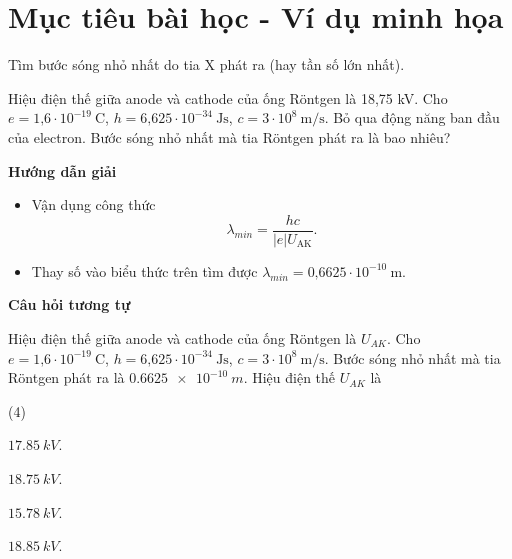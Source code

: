 \section{Mục tiêu bài học - Ví dụ minh họa}

\begin{dang}{Tìm bước sóng nhỏ nhất do tia X phát ra (hay tần số lớn nhất).}


{
Hiệu điện thế giữa anode và cathode của ống R\"ontgen là 18,75 kV. Cho $e =\text{1,6} \cdot 10^{-19}\ \text{C}$, $h = \text{6,625}\cdot 10^{-34}\ \text{Js}$, $c = 3\cdot 10^8\ \text{m/s}$. Bỏ qua động năng ban đầu của electron. Bước sóng nhỏ nhất mà tia R\"ontgen phát ra là bao nhiêu?}
{\begin{center}
\textbf{Hướng dẫn giải}
\end{center}
\begin{itemize}
	\item Vận dụng công thức 
	\begin{equation*}
	\lambda_{min}= \dfrac{hc}{|e|U_{\text{AK}}}.
	\end{equation*}
	\item Thay số vào biểu thức trên tìm được $\lambda_{min}=\text{0,6625} \cdot 10^{-10}\ \text{m}$.
\end{itemize}
\begin{center}
\textbf{Câu hỏi tương tự}
\end{center}

Hiệu điện thế giữa anode và cathode của ống R\"ontgen là $ U_{AK} $. Cho $e =\text{1,6} \cdot 10^{-19}\ \text{C}$, $h = \text{6,625}\cdot 10^{-34}\ \text{Js}$, $c = 3\cdot 10^8\ \text{m/s}$. Bước sóng nhỏ nhất mà tia R\"ontgen phát ra là $ \SI{0,6625 e-10}{m} $. Hiệu điện thế $ U_{AK} $ là
\begin{mcq}(4)
	\item $ \SI{17,85}{kV} $.
	\item $ \SI{18,75}{kV} $.
	\item $ \SI{15,78}{kV} $.
	\item $ \SI{18,85}{kV} $.
\end{mcq}

}
\end{dang}
